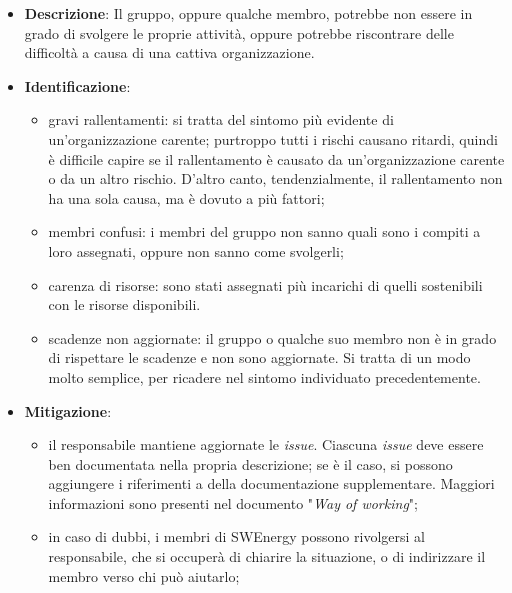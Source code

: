 \label{risk:organizzazione carente}
\begin{itemize}
	\item \textbf{Descrizione}:
	      Il gruppo, oppure qualche membro, potrebbe non essere in grado di
	      svolgere le proprie attività, oppure potrebbe riscontrare delle
	      difficoltà a causa di una cattiva organizzazione.
	\item \textbf{Identificazione}:
	      \begin{itemize}
		      \item gravi rallentamenti: si tratta del sintomo più evidente di
		            un'organizzazione carente; purtroppo tutti i rischi causano
		            ritardi, quindi è difficile capire se il rallentamento è
		            causato da un'organizzazione carente o da un altro rischio.
		            D'altro canto, tendenzialmente, il rallentamento non ha una
		            sola causa, ma è dovuto a più fattori;

		      \item membri confusi: i membri del gruppo non sanno quali sono i
		            compiti a loro assegnati, oppure non sanno come svolgerli;

		      \item carenza di risorse: sono stati assegnati più incarichi di
		            quelli sostenibili con le risorse disponibili.

		      \item scadenze non aggiornate: il gruppo o qualche suo membro non
		            è in grado di rispettare le scadenze e non sono aggiornate.
		            Si tratta di un modo molto semplice, per ricadere nel
		            sintomo individuato precedentemente.
	      \end{itemize}
	\item \textbf{Mitigazione}:
	      \begin{itemize}
		      \item il responsabile mantiene aggiornate le \textit{issue}.
		            Ciascuna \textit{issue} deve essere ben documentata nella
		            propria descrizione; se è il caso, si possono aggiungere i
		            riferimenti a della documentazione supplementare. Maggiori
		            informazioni sono presenti nel documento "\textit{Way of
			            working}";

		      \item in caso di dubbi, i membri di SWEnergy possono rivolgersi
		            al responsabile, che si occuperà di chiarire la situazione,
		            o di indirizzare il membro verso chi può aiutarlo;


\end{itemize}
\end{itemize}
